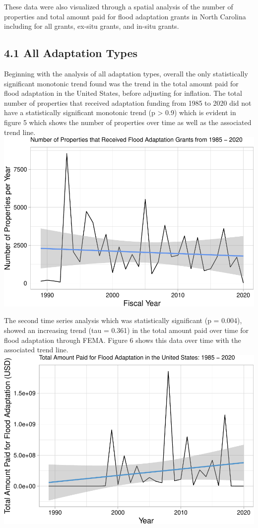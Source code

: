 \documentclass[
  12pt,
]{article}
\begin{document}
These data were also visualized through a spatial analysis of the number
of properties and total amount paid for flood adaptation grants in North
Carolina including for all grants, ex-situ grants, and in-situ grants.

\hypertarget{all-adaptation-types}{%
\subsection{4.1 All Adaptation Types}\label{all-adaptation-types}}

Beginning with the analysis of all adaptation types, overall the only
statistically significant monotonic trend found was the trend in the
total amount paid for flood adaptation in the United States, before
adjusting for inflation. The total number of properties that received
adaptation funding from 1985 to 2020 did not have a statistically
significant monotonic trend (p \textgreater{} 0.9) which is evident in
figure 5 which shows the number of properties over time as well as the
associated trend line. \newline
\includegraphics{finalreport_files/figure-latex/unnamed-chunk-9-1.pdf}

The second time series analysis which was statistically significant (p =
0.004), showed an increasing trend (tau = 0.361) in the total amount
paid over time for flood adaptation through FEMA. Figure 6 shows this
data over time with the associated trend line. \newline
\includegraphics{finalreport_files/figure-latex/unnamed-chunk-10-1.pdf}
\end{document}
